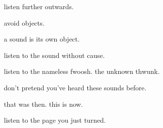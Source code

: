 \documentclass[extrafontsizes, 48pt]{memoir}
\newcommand\blankpage{%
    \null
    \thispagestyle{empty}%
    \addtocounter{page}{-1}%
    \newpage}
\begin{document}
	\begin{minipage}{.6\textwidth}
	listen further outwards. 
	\end{minipage}
	\newpage
	
	\begin{minipage}{.6\textwidth}
	avoid objects.
	\afterpage{\blankpage}
	\end{minipage}
	\newpage

	\begin{minipage}{.6\textwidth}
	a sound is its own object.
	\end{minipage}
	\newpage

	\begin{minipage}{.6\textwidth}
	listen to the sound without cause.
	\end{minipage}
	\newpage

	\begin{minipage}{.6\textwidth}
	listen to the nameless fwoosh. the unknown thwunk.
	\end{minipage}
	\newpage

	\begin{minipage}{.6\textwidth}
	don't pretend you've heard these sounds before.
	\end{minipage}
	\newpage

	\begin{minipage}{.6\textwidth}
	that was then. this is now.
	\afterpage{\blankpage}
	\end{minipage}
	\newpage

	\begin{minipage}{.6\textwidth}
	listen to the page you just turned.
	\end{minipage}
	\newpage
\end{document}
